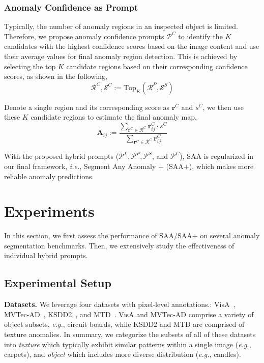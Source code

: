 \subsubsection{Anomaly Confidence as Prompt}

Typically, the number of anomaly regions in an inspected object is limited. Therefore, we propose anomaly confidence prompts $\mathcal{P}^C$ to identify the $K$ candidates with the highest confidence scores based on the image content and use their average values for final anomaly region detection. This is achieved by selecting the top $K$ candidate regions based on their corresponding confidence scores, as shown in the following,
\begin{equation}
\label{eq:confidence-prompts}
    \mathcal{R}^C, \mathcal{S}^C := \mathrm{Top}_K(\mathcal{R}^P,\mathcal{S}^S)
\end{equation}

Denote a single region and its corresponding score as $\mathbf{r}^C$ and $s^C$, we then use these $K$ candidate regions to estimate the final anomaly map, 
\begin{equation}
\label{eq:fusion}
    \mathbf{A}_{ij} := \frac{ \sum_{\mathbf{r}^C \in \mathcal{R}^C}
    \mathbf{r}^C_{i j} \cdot s^C}{
    \sum_{\mathbf{r}^C \in \mathcal{R}^C}
    \mathbf{r}^C_{i j}}   
\end{equation}

With the proposed hybrid prompts ($ \mathcal{P}^L, \mathcal{P}^P,\mathcal{P}^S$, and $\mathcal{P}^C$), SAA is regularized in our final framework, \textit{i.e.}, Segment Any Anomaly $+$ (SAA$+$), which makes more reliable anomaly predictions.

\section{Experiments}
\label{sec:experiment}
In this section, we first assess the performance of SAA/SAA$+$ on several anomaly segmentation benchmarks. Then, we extensively study the effectiveness of individual hybrid prompts.

\subsection{Experimental Setup}

\noindent\textbf{Datasets.} We leverage four datasets with pixel-level annotations.: VisA~\cite{zou2022spot}, MVTec-AD~\cite{bergmann2019mvtec}, KSDD2~\cite{bozic_mixed_2021}, and MTD~\cite{mtd2018}. VisA and MVTec-AD comprise a variety of object subsets, \textit{e.g.}, circuit boards, while KSDD2 and MTD are comprised of texture anomalies. 
In summary, we categorize the subsets of all of these datasets into \textit{texture} which typically exhibit similar patterns within a single image (\textit{e.g.}, carpets), and \textit{object}  which includes more diverse distribution (\textit{e.g.}, candles). 

